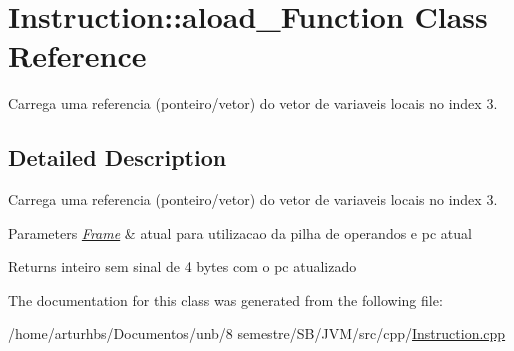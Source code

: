 \hypertarget{classInstruction_1_1aload__3Function}{}\section{Instruction\+:\+:aload\+\_\+Function Class Reference}
\label{classInstruction_1_1aload__3Function}


Carrega uma referencia (ponteiro/vetor) do vetor de variaveis locais no index 3.  




\subsection{Detailed Description}
Carrega uma referencia (ponteiro/vetor) do vetor de variaveis locais no index 3. 


\begin{DoxyParams}{Parameters}
{\em \hyperlink{classFrame}{Frame}} & atual para utilizacao da pilha de operandos e pc atual \\
\hline
\end{DoxyParams}
\begin{DoxyReturn}{Returns}
inteiro sem sinal de 4 bytes com o pc atualizado 
\end{DoxyReturn}


The documentation for this class was generated from the following file\+:\begin{DoxyCompactItemize}
\item 
/home/arturhbs/\+Documentos/unb/8 semestre/\+S\+B/\+J\+V\+M/src/cpp/\hyperlink{Instruction_8cpp}{Instruction.\+cpp}\end{DoxyCompactItemize}
